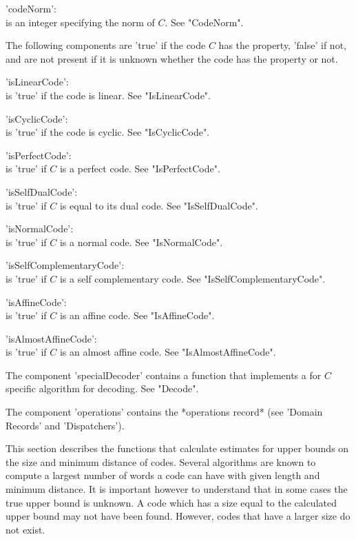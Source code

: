 'codeNorm': \\
        is an integer specifying the norm of $C$. See "CodeNorm".

The  following components are 'true'  if  the code  $C$ has the property,
'false' if not, and are not present if it is unknown whether the code has
the property or not.

'isLinearCode': \\
        is 'true' if the code is linear. See "IsLinearCode".

'isCyclicCode': \\
        is 'true' if the code is cyclic. See "IsCyclicCode".

'isPerfectCode': \\
        is 'true' if $C$ is a perfect code. See "IsPerfectCode".

'isSelfDualCode': \\
        is 'true' if $C$ is equal to its dual code. See "IsSelfDualCode".

'isNormalCode': \\
        is 'true' if $C$ is a normal code. See "IsNormalCode".

'isSelfComplementaryCode': \\
        is 'true' if $C$ is a self complementary code. See 
        "IsSelfComplementaryCode".

'isAffineCode': \\
        is 'true' if $C$ is an affine code. See  "IsAffineCode".

'isAlmostAffineCode': \\
        is 'true' if $C$ is an almost affine code. See "IsAlmostAffineCode".

The component 'specialDecoder' contains a  function that implements a for
$C$ specific algorithm for decoding. See "Decode".

The component 'operations' contains  the *operations record* (see 'Domain
Records' and 'Dispatchers').


This  section describes the functions  that calculate estimates for upper
bounds on the size and minimum distance  of codes. Several algorithms are
known to compute a largest  number of words a   code can have with  given
length and  minimum distance. It is important  however to understand that
in some cases the true  upper bound is unknown.  A code which has a  size
equal to  the calculated upper bound may  not  have been found.  However,
codes that have a larger size do not exist.

